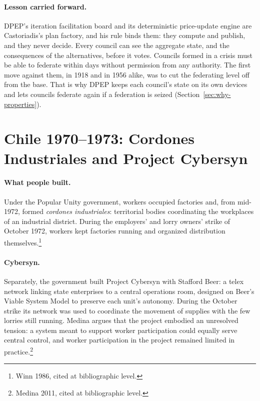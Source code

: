 \documentclass[10pt,twoside,openany]{book}
\theoremstyle{dpepstyle}
\begin{document}
\paragraph{Lesson carried forward.} DPEP's iteration facilitation board and its deterministic price-update engine are Castoriadis's plan factory, and his rule binds them: they compute and publish, and they never decide. Every council can see the aggregate state, and the consequences of the alternatives, before it votes. Councils formed in a crisis must be able to federate within days without permission from any authority. The first move against them, in 1918 and in 1956 alike, was to cut the federating level off from the base. That is why DPEP keeps each council's state on its own devices and lets councils federate again if a federation is seized (Section~\ref{sec:why-properties}).

\section{Chile 1970--1973: Cordones Industriales and Project Cybersyn}
\label{sec:hist-chile}

\paragraph{What people built.} Under the Popular Unity government, workers occupied factories and, from mid-1972, formed \emph{cordones industriales}: territorial bodies coordinating the workplaces of an industrial district. During the employers' and lorry owners' strike of October 1972, workers kept factories running and organized distribution themselves.\footnote{Winn 1986, cited at bibliographic level.}

\paragraph{Cybersyn.} Separately, the government built Project Cybersyn with Stafford Beer: a telex network linking state enterprises to a central operations room, designed on Beer's Viable System Model to preserve each unit's autonomy. During the October strike its network was used to coordinate the movement of supplies with the few lorries still running. Medina argues that the project embodied an unresolved tension: a system meant to support worker participation could equally serve central control, and worker participation in the project remained limited in practice.\footnote{Medina 2011, cited at bibliographic level.}
\end{document}
